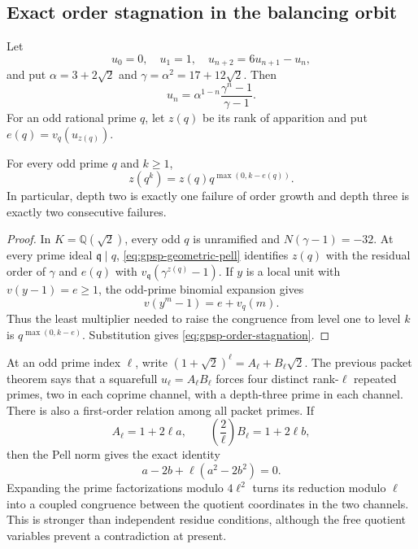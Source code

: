 \subsection{Exact order stagnation in the balancing orbit}

Let
\[
 u_0=0,\quad u_1=1,\quad u_{n+2}=6u_{n+1}-u_n,
\]
and put $\alpha=3+2\sqrt2$ and $\gamma=\alpha^2=17+12\sqrt2$.  Then
\begin{equation}\label{eq:gpsp-geometric-pell}
 u_n=\alpha^{1-n}\frac{\gamma^n-1}{\gamma-1}.
\end{equation}
For an odd rational prime $q$, let $z(q)$ be its rank of apparition and put
$e(q)=v_q(u_{z(q)})$.

\begin{theorem}
\label{thm:gpsp-order-stagnation}
For every odd prime $q$ and $k\geq1$,
\begin{equation}\label{eq:gpsp-order-stagnation}
 z(q^k)=z(q)q^{\max(0,k-e(q))}.
\end{equation}
In particular, depth two is exactly one failure of order growth and depth
three is exactly two consecutive failures.
\end{theorem}

\begin{proof}
In $K=\mathbb Q(\sqrt2)$, every odd $q$ is unramified and
$N(\gamma-1)=-32$.  At every prime ideal $\mathfrak q\mid q$,
\eqref{eq:gpsp-geometric-pell} identifies $z(q)$ with the residual order of
$\gamma$ and $e(q)$ with
$v_{\mathfrak q}(\gamma^{z(q)}-1)$.  If $y$ is a local unit with
$v(y-1)=e\geq1$, the odd-prime binomial expansion gives
\[
                         v(y^m-1)=e+v_q(m).
\]
Thus the least multiplier needed to raise the congruence from level one to
level $k$ is $q^{\max(0,k-e)}$.  Substitution gives
\eqref{eq:gpsp-order-stagnation}.
\end{proof}

At an odd prime index $\ell$, write
$(1+\sqrt2)^\ell=A_\ell+B_\ell\sqrt2$.  The previous packet theorem says
that a squarefull $u_\ell=A_\ell B_\ell$ forces four distinct rank-$\ell$
repeated primes, two in each coprime channel, with a depth-three prime in
each channel.  There is also a first-order relation among all packet primes.
If
\[
 A_\ell=1+2\ell a,\qquad
 \left(\frac2\ell\right)B_\ell=1+2\ell b,
\]
then the Pell norm gives the exact identity
\begin{equation}\label{eq:gpsp-channel-ledger}
                    a-2b+\ell(a^2-2b^2)=0.
\end{equation}
Expanding the prime factorizations modulo $4\ell^2$ turns its reduction
modulo $\ell$ into a coupled congruence between the quotient coordinates in
the two channels.  This is stronger than independent residue conditions,
although the free quotient variables prevent a contradiction at present.

